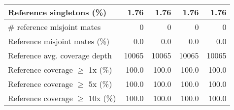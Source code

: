 \documentclass[12pt,a4paper]{article}
\begin{document}
\begin{table}[ht]
\begin{center}
\begin{tabular}{|l*{4}{|r}|}
Reference singletons (\%) & 1.76 & 1.76 & 1.76 & 1.76 \\ \hline
\# reference misjoint mates & 0 & 0 & 0 & 0 \\ \hline
Reference misjoint mates (\%) & 0.0 & 0.0 & 0.0 & 0.0 \\ \hline
Reference avg. coverage depth & 10065 & 10065 & 10065 & 10065 \\ \hline
Reference coverage $\geq$ 1x (\%) & 100.0 & 100.0 & 100.0 & 100.0 \\ \hline
Reference coverage $\geq$ 5x (\%) & 100.0 & 100.0 & 100.0 & 100.0 \\ \hline
Reference coverage $\geq$ 10x (\%) & 100.0 & 100.0 & 100.0 & 100.0 \\ \hline
\end{tabular}
\end{center}
\end{table}
\end{document}
